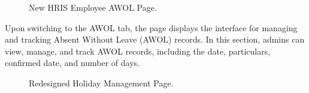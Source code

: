     \begin{figure}[H]
        \centering
        \caption{New HRIS Employee AWOL Page.}
        \label{fig:leave-awol}
    \end{figure}

    Upon switching to the AWOL tab, the page displays the interface for managing and tracking Absent Without Leave (AWOL) records. In this section, admins can view, manage, and track AWOL records, including the date, particulars, confirmed date, and number of days.

    \begin{figure}[H]
        \centering
        \caption{Redesigned Holiday Management Page.}
        \label{fig:holiday}
    \end{figure}


